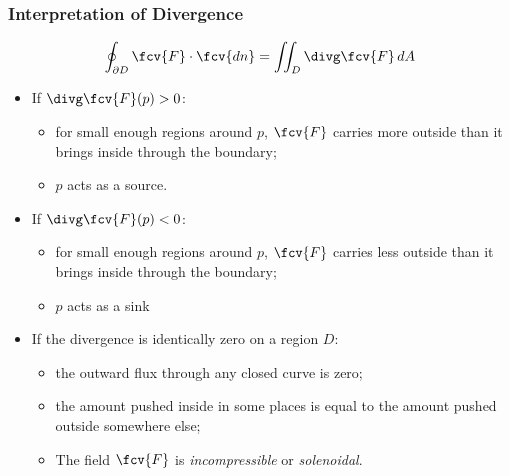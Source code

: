 \begin{frame}
\small
  \frametitle{Interpretation of Divergence}

$$\oint_{\partial D} \fcv{F} \cdot \fcv{dn} = \iint_{D} \divg \fcv{F} \, dA$$

  \begin{itemize}
    \item If $\divg \fcv{F}(p)>0$:
    \begin{itemize}
      \item \pause for small enough regions around $p$, $\fcv{F}$ carries more outside than it brings inside through the boundary;
      \item \pause $p$ acts as a source.
    \end{itemize}
    \item If $\divg \fcv{F}(p)<0$:
    \begin{itemize}
      \item \pause for small enough regions around $p$, $\fcv{F}$ carries less outside than it brings inside through the boundary;
      \item \pause $p$ acts as a sink
    \end{itemize}
    \item If the divergence is identically zero on a region $D$:
    \begin{itemize}
      \item \pause the outward flux through any closed curve is zero;
      \item \pause the amount pushed inside in some places is equal to the amount pushed outside somewhere else;
      \item The field $\fcv{F}$ is \emph{incompressible} or \emph{solenoidal}.
    \end{itemize}
  \end{itemize}
\end{frame}